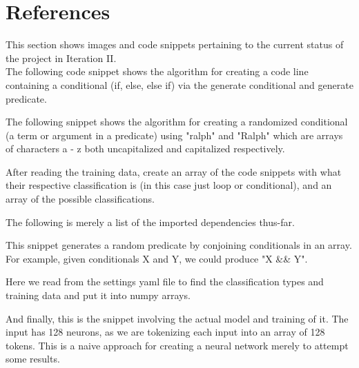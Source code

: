 \documentclass{article}
\begin{document}
    \section{References}
    This section shows images and code snippets pertaining to the current status of the project in Iteration II. \\

    The following code snippet shows the algorithm for creating a code line containing a conditional (if, else, else if) via the generate conditional and generate predicate.
    

    The following snippet shows the algorithm for creating a randomized conditional (a term or argument in a predicate) using "ralph" and "Ralph" which are arrays of characters a - z both uncapitalized and capitalized respectively.
    

    After reading the training data, create an array of the code snippets with what their respective classification is (in this case just loop or conditional), and an array of the possible classifications.
    

    The following is merely a list of the imported dependencies thus-far.
    

    This snippet generates a random predicate by conjoining conditionals in an array.
    For example, given conditionals X and Y, we could produce "X \&\& Y".
    

    Here we read from the settings yaml file to find the classification types and training data and put it into numpy arrays.
    

    And finally, this is the snippet involving the actual model and training of it.
    The input has 128 neurons, as we are tokenizing each input into an array of 128 tokens.
    This is a naive approach for creating a neural network merely to attempt some results.
    

    

    

    
\end{document}
